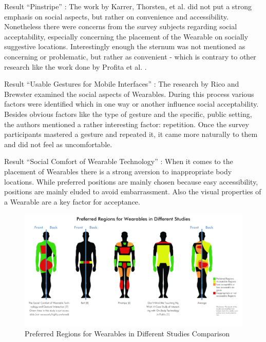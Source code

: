 \documentclass{sigchi}
\begin{document}
Result “Pinstripe” \cite{pinstripe} : The work by Karrer, Thorsten, et al. did not put a strong emphasis on social aspects, but rather on convenience and accessibility. Nonetheless there were concerns from the survey subjects regarding social acceptability, especially concerning the placement of the Wearable on socially suggestive locations. Interestingly enough the sternum was not mentioned as concerning or problematic, but rather as convenient - which is contrary to other research like the work done by Profita et al. \cite{touch-wrist}.

Result “Usable Gestures for Mobile Interfaces” \cite{usable-gesture}: The research by Rico and Brewster examined the social aspects of Wearables. During this process various factors were identified which in one way or another influence social acceptability. Besides obvious factors like the type of gesture and the specific, public setting, the authors mentioned a rather interesting factor: repetition. Once the survey participants mastered a gesture and repeated it, it came more naturally to them and did not feel as uncomfortable.

Result “Social Comfort of Wearable Technology” \cite{social-comfort} : When it comes to the placement of Wearables there is a strong aversion to inappropriate body locations. While preferred positions are mainly chosen because easy accessibility, positions are mainly eluded to avoid embarrassment. Also the visual properties of a Wearable are a key factor for acceptance.

\begin{figure}[t]
  \includegraphics[width=\textwidth]{body-areas.png}
  \caption{Preferred Regions for Wearables in Different Studies Comparison
  \protect\cite{touch-wrist,pinstripe,social-comfort,belt,simpleskin}}
 \label{fig:body}
\end{figure}
\end{document}
